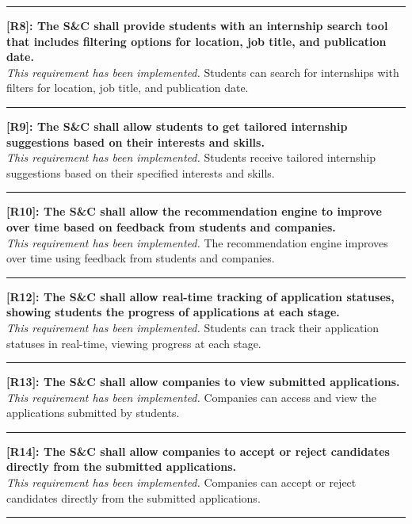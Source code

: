 \noindent\rule{16cm}{0.4pt}

\noindent\textbf{[R8]: The S\&C shall provide students with an internship search tool that includes filtering options for location, job title, and publication date.} \\
\textit{This requirement has been implemented.} Students can search for internships with filters for location, job title, and publication date.

\noindent\rule{16cm}{0.4pt}

\noindent\textbf{[R9]: The S\&C shall allow students to get tailored internship suggestions based on their interests and skills.} \\
\textit{This requirement has been implemented.} Students receive tailored internship suggestions based on their specified interests and skills.

\noindent\rule{16cm}{0.4pt}

\noindent\textbf{[R10]: The S\&C shall allow the recommendation engine to improve over time based on feedback from students and companies.} \\
\textit{This requirement has been implemented.} The recommendation engine improves over time using feedback from students and companies.

\noindent\rule{16cm}{0.4pt}


\noindent\textbf{[R12]: The S\&C shall allow real-time tracking of application statuses, showing students the progress of applications at each stage.} \\
\textit{This requirement has been implemented.} Students can track their application statuses in real-time, viewing progress at each stage.

\noindent\rule{16cm}{0.4pt}

\noindent\textbf{[R13]: The S\&C shall allow companies to view submitted applications.} \\
\textit{This requirement has been implemented.} Companies can access and view the applications submitted by students.

\noindent\rule{16cm}{0.4pt}

\noindent\textbf{[R14]: The S\&C shall allow companies to accept or reject candidates directly from the submitted applications.} \\
\textit{This requirement has been implemented.} Companies can accept or reject candidates directly from the submitted applications.

\noindent\rule{16cm}{0.4pt}


